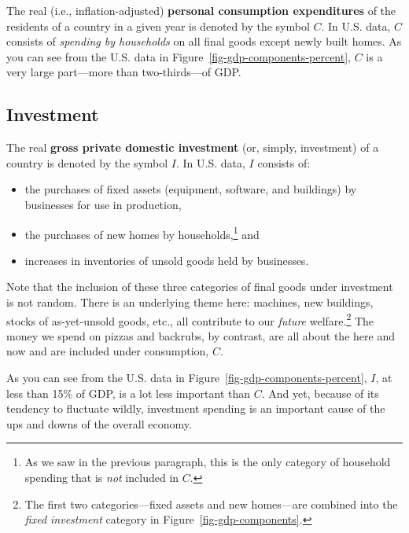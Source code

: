 \documentclass[
  letterpaper,
]{book}
\providecommand{\tightlist}{%
  \setlength{\itemsep}{0pt}\setlength{\parskip}{0pt}}\usepackage{longtable,booktabs,array}
\theoremstyle{plain}
\theoremstyle{remark}
\begin{document}

The real (i.e., inflation-adjusted) \textbf{personal consumption
expenditures} of the residents of a country in a given year is denoted
by the symbol \(C\). In U.S. data, \(C\) consists of \emph{spending by
households} on all final goods except newly built homes. As you can see
from the U.S. data in Figure~\ref{fig-gdp-components-percent}, \(C\) is
a very large part---more than two-thirds---of GDP.

\subsection{Investment}\label{sec-investment-nia}


The real \textbf{gross private domestic investment} (or, simply,
investment) of a country is denoted by the symbol \(I\). In U.S. data,
\(I\) consists of:

\begin{itemize}
\tightlist
\item
  the purchases of fixed assets (equipment, software, and buildings) by
  businesses for use in production,
\item
  the purchases of new homes by households,\footnote{As we saw in the
    previous paragraph, this is the only category of household spending
    that is \emph{not} included in \(C\).} and
\item
  increases in inventories of unsold goods held by businesses.
\end{itemize}

Note that the inclusion of these three categories of final goods under
investment is not random. There is an underlying theme here: machines,
new buildings, stocks of as-yet-unsold goods, etc., all contribute to
our \emph{future} welfare.\footnote{The first two categories---fixed
  assets and new homes---are combined into the \emph{fixed investment}
  category in Figure~\ref{fig-gdp-components}.} The money we spend on
pizzas and backrubs, by contrast, are all about the here and now and are
included under consumption, \(C\).

As you can see from the U.S. data in
Figure~\ref{fig-gdp-components-percent}, \(I\), at less than 15\% of
GDP, is a lot less important than \(C\). And yet, because of its
tendency to fluctuate wildly, investment spending is an important cause
of the ups and downs of the overall economy.
\end{document}
